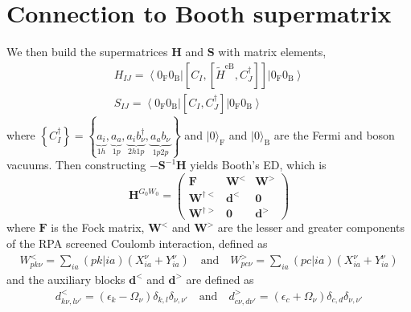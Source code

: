\section{Connection to Booth supermatrix}
We then build the supermatrices $\mathbf{H}$ and $\mathbf{S}$ with matrix elements,
$$
\begin{gathered}
H_{I J}=\left\langle 0_{\mathrm{F}} 0_{\mathrm{B}}\right|\left[C_I,\left[\tilde{H}^{\mathrm{eB}}, C_J^{\dagger}\right]\right]\left|0_{\mathrm{F}} 0_{\mathrm{B}}\right\rangle \\
S_{I J}=\left\langle 0_{\mathrm{F}} 0_{\mathrm{B}}\right|\left[C_I, C_J^{\dagger}\right]\left|0_{\mathrm{F}} 0_{\mathrm{B}}\right\rangle
\end{gathered}
$$
where $\left\{C_I^{\dagger}\right\}=\left\{\underbrace{a_i}_{1h}, \underbrace{a_a}_{1p}, \underbrace{a_i b_\nu^{\dagger}}_{2h1p}, \underbrace{a_a b_\nu}_{1p2p}\right\}$ and $|0\rangle_{\mathrm{F}}$ and $|0\rangle_{\mathrm{B}}$ are the Fermi and boson vacuums. Then constructing $-\bm{S}^{-1}\bm{H}$ yields Booth's ED, which is
\begin{equation}
    \bm{H}^{G_0 W_0} = \begin{pmatrix} \bm{F} & \bm{W}^< & \bm{W}^> \\ \bm{W}^{\dagger<} & \bm{d}^< & \bm{0} \\ \bm{W}^{\dagger>} & \bm{0} & \bm{d}^> \end{pmatrix}
\end{equation}
where $\bm{F}$ is the Fock matrix, $\bm{W}^<$ and $\bm{W}^>$ are the lesser and greater components of the RPA screened Coulomb interaction, defined as
\begin{equation}
\begin{split}
    W_{pk\nu}^{<} = \sum_{ia} (pk|ia) \left( X_{ia}^{\nu} + Y_{ia}^{\nu} \right) \quad \text{and} \quad W_{pc\nu}^{>} = \sum_{ia} (pc|ia) \left( X_{ia}^{\nu} + Y_{ia}^{\nu} \right)
\end{split}
\end{equation}
and the auxiliary blocks $\bm{d}^<$ and $\bm{d}^>$ are defined as
\begin{equation}
\begin{split}
    d_{k\nu,l\nu'}^{<} = \left(\epsilon_k - \Omega_\nu\right) \delta_{k,l} \delta_{\nu,\nu'}\quad \text{and} \quad
    d_{c\nu,d\nu'}^{>} = \left(\epsilon_c + \Omega_\nu\right) \delta_{c,d} \delta_{\nu,\nu'}\\
\end{split}
\end{equation}
